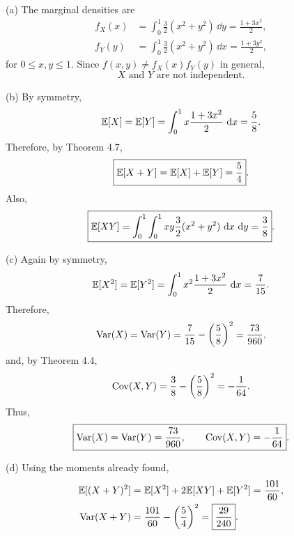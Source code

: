 \documentclass[11pt,oneside]{article}
\begin{document}
\begin{solution}
\noindent\textup{(a)} The marginal densities are
\[
\begin{aligned}
    f_X(x)
    &=\int_0^1 \frac32(x^2+y^2)\,\dd y
      =\frac{1+3x^2}{2},\\
    f_Y(y)
    &=\int_0^1 \frac32(x^2+y^2)\,\dd x
      =\frac{1+3y^2}{2},
\end{aligned}
\]
for $0\leq x,y\leq1$. Since $f(x,y)\neq f_X(x)f_Y(y)$ in general,
\[
    \boxed{X\text{ and }Y\text{ are not independent}.}
\]

\medskip
\noindent\textup{(b)} By symmetry,
\[
    \mathbb{E}[X]=\mathbb{E}[Y]
    =\int_0^1 x\frac{1+3x^2}{2}\,\mathop{}\!\mathrm{d} x
    =\frac58.
\]
Therefore, by Theorem 4.7,
\[
    \boxed{\mathbb{E}[X+Y]=\mathbb{E}[X]+\mathbb{E}[Y]=\frac54}.
\]
Also,
\[
    \boxed{\mathbb{E}[XY]
    =\int_0^1\int_0^1 xy\frac32(x^2+y^2)\,\mathop{}\!\mathrm{d} x\,\mathop{}\!\mathrm{d} y
    =\frac38}.
\]

\medskip
\noindent\textup{(c)} Again by symmetry,
\[
    \mathbb{E}[X^2]=\mathbb{E}[Y^2]
    =\int_0^1 x^2\frac{1+3x^2}{2}\,\mathop{}\!\mathrm{d} x
    =\frac7{15}.
\]
Therefore,
\[
    \operatorname{Var}(X)=\operatorname{Var}(Y)
    =\frac7{15}-\left(\frac58\right)^2
    =\frac{73}{960},
\]
and, by Theorem 4.4,
\[
    \operatorname{Cov}(X,Y)
    =\frac38-\left(\frac58\right)^2
    =-\frac1{64}.
\]
Thus,
\[
    \boxed{\operatorname{Var}(X)=\operatorname{Var}(Y)=\frac{73}{960},
    \qquad
    \operatorname{Cov}(X,Y)=-\frac1{64}}.
\]

\medskip
\noindent\textup{(d)} Using the moments already found,
\[
\begin{aligned}
    \mathbb{E}[(X+Y)^2]
    &=\mathbb{E}[X^2]+2\mathbb{E}[XY]+\mathbb{E}[Y^2]
      =\frac{101}{60},\\
    \operatorname{Var}(X+Y)
    &=\frac{101}{60}-\left(\frac54\right)^2
      =\boxed{\frac{29}{240}}.
\end{aligned}
\]
\end{solution}
\end{document}
